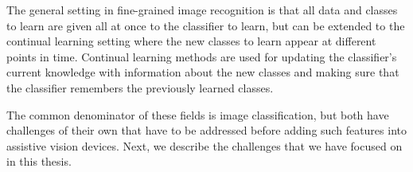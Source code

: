 The general setting in fine-grained image recognition is that all data and classes to learn are given all at once to the classifier to learn, but can be extended to the continual learning setting where the new classes to learn appear at different points in time. Continual learning methods are used for updating the classifier's current knowledge with information about the new classes and making sure that the classifier remembers the previously learned classes. 

The common denominator of these fields is image classification, but both have challenges of their own that have to be addressed before adding such features into assistive vision devices. Next, we describe the challenges that we have focused on in this thesis. 



